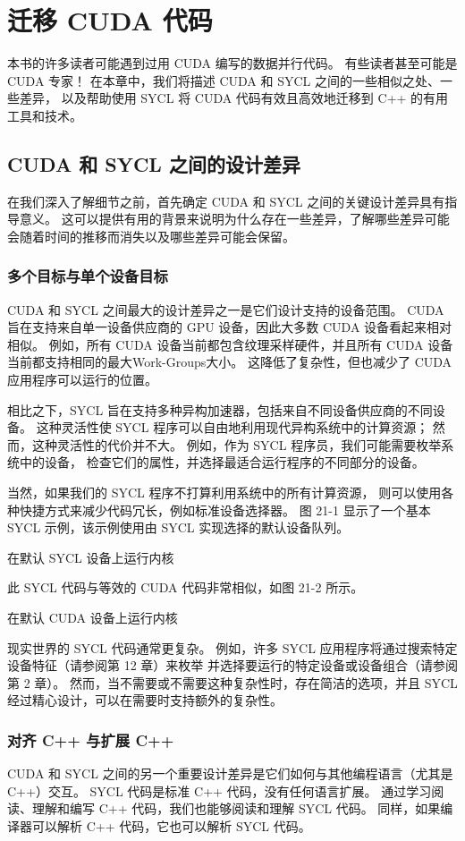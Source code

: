 \section{迁移 CUDA 代码}
本书的许多读者可能遇到过用 CUDA 编写的数据并行代码。 
有些读者甚至可能是 CUDA 专家！ 在本章中，我们将描述 CUDA 和 SYCL 之间的一些相似之处、一些差异，
以及帮助使用 SYCL 将 CUDA 代码有效且高效地迁移到 C++ 的有用工具和技术。

\subsection{CUDA 和 SYCL 之间的设计差异}
在我们深入了解细节之前，首先确定 CUDA 和 SYCL 之间的关键设计差异具有指导意义。 
这可以提供有用的背景来说明为什么存在一些差异，了解哪些差异可能会随着时间的推移而消失以及哪些差异可能会保留。

\subsubsection{多个目标与单个设备目标}
CUDA 和 SYCL 之间最大的设计差异之一是它们设计支持的设备范围。 
CUDA 旨在支持来自单一设备供应商的 GPU 设备，因此大多数 CUDA 设备看起来相对相似。 
例如，所有 CUDA 设备当前都包含纹理采样硬件，并且所有 CUDA 设备当前都支持相同的最大Work-Groups大小。 
这降低了复杂性，但也减少了 CUDA 应用程序可以运行的位置。

相比之下，SYCL 旨在支持多种异构加速器，包括来自不同设备供应商的不同设备。 
这种灵活性使 SYCL 程序可以自由地利用现代异构系统中的计算资源； 
然而，这种灵活性的代价并不大。 例如，作为 SYCL 程序员，我们可能需要枚举系统中的设备，
检查它们的属性，并选择最适合运行程序的不同部分的设备。

当然，如果我们的 SYCL 程序不打算利用系统中的所有计算资源，
则可以使用各种快捷方式来减少代码冗长，例如标准设备选择器。 
图 21-1 显示了一个基本 SYCL 示例，该示例使用由 SYCL 实现选择的默认设备队列。

{\color{red} 在默认 SYCL 设备上运行内核}

此 SYCL 代码与等效的 CUDA 代码非常相似，如图 21-2 所示。

{\color{red} 在默认 CUDA 设备上运行内核}

现实世界的 SYCL 代码通常更复杂。 
例如，许多 SYCL 应用程序将通过搜索特定设备特征（请参阅第 12 章）来枚举
并选择要运行的特定设备或设备组合（请参阅第 2 章）。 
然而，当不需要或不需要这种复杂性时，存在简洁的选项，并且 SYCL 经过精心设计，可以在需要时支持额外的复杂性。

\subsubsection{对齐 C++ 与扩展 C++}
CUDA 和 SYCL 之间的另一个重要设计差异是它们如何与其他编程语言（尤其是 C++）交互。 
SYCL 代码是标准 C++ 代码，没有任何语言扩展。 
通过学习阅读、理解和编写 C++ 代码，我们也能够阅读和理解 SYCL 代码。 
同样，如果编译器可以解析 C++ 代码，它也可以解析 SYCL 代码。

